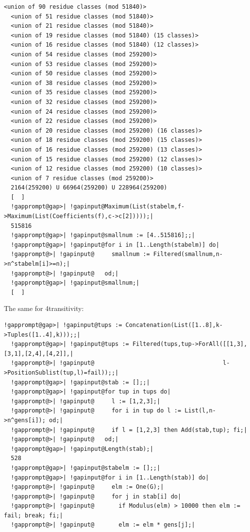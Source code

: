 \documentclass[a4paper,11pt]{report}
\begin{document}
{{\begin{Verbatim}[commandchars=!@|,fontsize=\small,frame=single,label=Example]
  <union of 90 residue classes (mod 51840)>
  <union of 51 residue classes (mod 51840)>
  <union of 21 residue classes (mod 51840)>
  <union of 19 residue classes (mod 51840) (15 classes)>
  <union of 16 residue classes (mod 51840) (12 classes)>
  <union of 54 residue classes (mod 259200)>
  <union of 53 residue classes (mod 259200)>
  <union of 50 residue classes (mod 259200)>
  <union of 38 residue classes (mod 259200)>
  <union of 35 residue classes (mod 259200)>
  <union of 32 residue classes (mod 259200)>
  <union of 24 residue classes (mod 259200)>
  <union of 22 residue classes (mod 259200)>
  <union of 20 residue classes (mod 259200) (16 classes)>
  <union of 18 residue classes (mod 259200) (15 classes)>
  <union of 16 residue classes (mod 259200) (13 classes)>
  <union of 15 residue classes (mod 259200) (12 classes)>
  <union of 12 residue classes (mod 259200) (10 classes)>
  <union of 7 residue classes (mod 259200)>
  2164(259200) U 66964(259200) U 228964(259200)
  [  ]
  !gapprompt@gap>| !gapinput@Maximum(List(stabelm,f->Maximum(List(Coefficients(f),c->c[2]))));|
  515816
  !gapprompt@gap>| !gapinput@smallnum := [4..515816];;|
  !gapprompt@gap>| !gapinput@for i in [1..Length(stabelm)] do|
  !gapprompt@>| !gapinput@     smallnum := Filtered(smallnum,n->n^stabelm[i]>=n);|
  !gapprompt@>| !gapinput@   od;|
  !gapprompt@gap>| !gapinput@smallnum;|
  [  ]
\end{Verbatim}
 The same for 4\texttt{}transitivity: 
\begin{Verbatim}[commandchars=!@|,fontsize=\small,frame=single,label=Example]
  !gapprompt@gap>| !gapinput@tups := Concatenation(List([1..8],k->Tuples([1..4],k)));;|
  !gapprompt@gap>| !gapinput@tups := Filtered(tups,tup->ForAll([[1,3],[3,1],[2,4],[4,2]],|
  !gapprompt@>| !gapinput@                                     l->PositionSublist(tup,l)=fail));;|
  !gapprompt@gap>| !gapinput@stab := [];;|
  !gapprompt@gap>| !gapinput@for tup in tups do|
  !gapprompt@>| !gapinput@     l := [1,2,3];|
  !gapprompt@>| !gapinput@     for i in tup do l := List(l,n->n^gens[i]); od;|
  !gapprompt@>| !gapinput@     if l = [1,2,3] then Add(stab,tup); fi;|
  !gapprompt@>| !gapinput@   od;|
  !gapprompt@gap>| !gapinput@Length(stab);|
  528
  !gapprompt@gap>| !gapinput@stabelm := [];;|
  !gapprompt@gap>| !gapinput@for i in [1..Length(stab)] do|
  !gapprompt@>| !gapinput@     elm := One(G);|
  !gapprompt@>| !gapinput@     for j in stab[i] do|
  !gapprompt@>| !gapinput@       if Modulus(elm) > 10000 then elm := fail; break; fi;|
  !gapprompt@>| !gapinput@       elm := elm * gens[j];|

\end{Verbatim}}}
\end{document}
